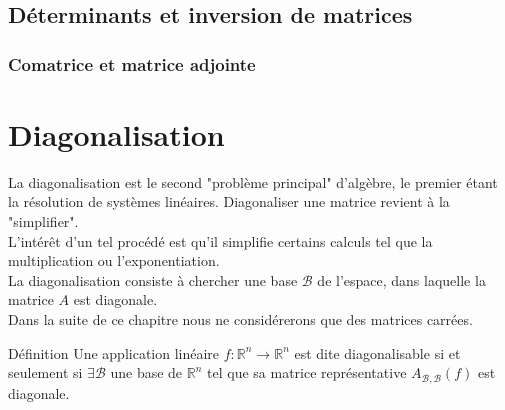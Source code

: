 \section{Déterminants et inversion de matrices}
\subsection{Comatrice et matrice adjointe}
\chapter{Diagonalisation}
  La diagonalisation est le second "problème principal" d'algèbre, le premier étant la résolution de systèmes
  linéaires.
Diagonaliser une matrice revient à la "simplifier".\\
L'intérêt d'un tel procédé est qu'il simplifie certains calculs tel que la multiplication ou l'exponentiation.\\
La diagonalisation consiste à chercher une base $\mathscr{B}$ de l'espace, dans laquelle la matrice $A$ est diagonale.\\
Dans la suite de ce chapitre nous ne considérerons que des matrices carrées.\\
\begin{bclogo}[couleur=blue!30,couleurBord=blue,arrondi=0.1,logo=\bcbook,ombre=true]{Définition}
Une application linéaire $f:\mathbb{R}^{n}\rightarrow\mathbb{R}^{n}$  est dite diagonalisable si et seulement si $\exists \mathscr{B}$ une base de $\mathbb{R}^{n}$ tel que sa matrice représentative $A_{\mathscr{B},\mathscr{B}}(f)$ est diagonale.
\end{bclogo}
